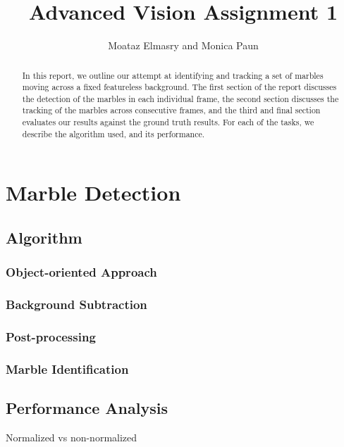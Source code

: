 \documentclass[10pt,a4paper,twocolumn]{report}
\author{Moataz Elmasry and Monica Paun}
\title{Advanced Vision Assignment 1}
\begin{document}
\maketitle

\begin{abstract}

In this report, we outline our attempt at identifying and tracking a set of marbles moving across a fixed featureless background. The first section of the report discusses the detection of the marbles in each individual frame, the second section discusses the tracking of the marbles across consecutive frames, and the third and final section evaluates our results against the ground truth results. For each of the tasks, we describe the algorithm used, and its performance.

\end{abstract}

\chapter{Marble Detection}


\section{Algorithm}

\subsection{Object-oriented Approach}

\subsection{Background Subtraction}

\subsection{Post-processing}

\subsection{Marble Identification}

\section{Performance Analysis}

Normalized vs non-normalized
\end{document}
